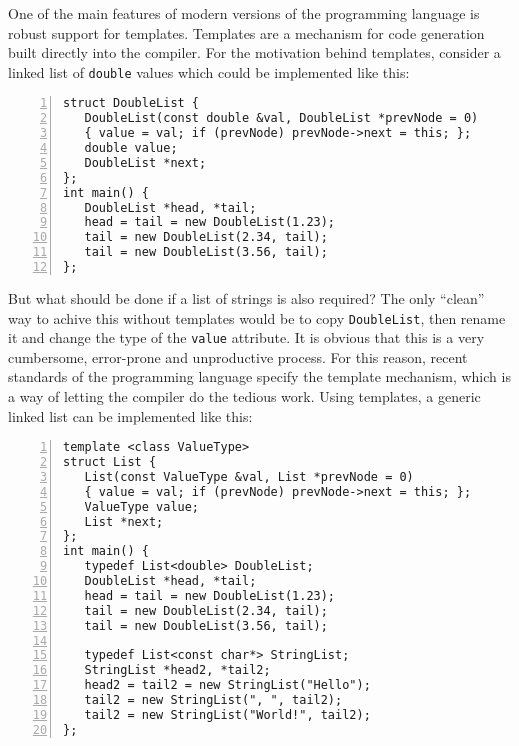 One of the main features of modern versions of the \Cplusplus programming
language is robust support for templates. Templates are a mechanism
for code generation built directly into the compiler.  For the
motivation behind templates, consider a linked list of \texttt{double}
values which could be implemented like this:
\begin{lstlisting}[basicstyle=\ttfamily\scriptsize,numbers=left,numberstyle=\tiny, numbersep=5pt]
struct DoubleList {
   DoubleList(const double &val, DoubleList *prevNode = 0)
   { value = val; if (prevNode) prevNode->next = this; };
   double value;
   DoubleList *next;
};
int main() {
   DoubleList *head, *tail;
   head = tail = new DoubleList(1.23);
   tail = new DoubleList(2.34, tail);
   tail = new DoubleList(3.56, tail);
};
\end{lstlisting}
But what should be done if a list of strings is also required? The
only ``clean'' way to achive this without templates would be to copy
\texttt{DoubleList}, then rename it and change the type of the
\texttt{value} attribute. It is obvious that this is a very
cumbersome, error-prone and unproductive process. For this reason,
recent standards of the \Cplusplus programming language specify the template
mechanism, which is a way of letting the compiler do the tedious work. Using
templates, a generic linked list can be implemented like this:
\begin{lstlisting}[basicstyle=\ttfamily\scriptsize,numbers=left,numberstyle=\tiny, numbersep=5pt]
template <class ValueType>
struct List {
   List(const ValueType &val, List *prevNode = 0)
   { value = val; if (prevNode) prevNode->next = this; };
   ValueType value;
   List *next;
};
int main() {
   typedef List<double> DoubleList;
   DoubleList *head, *tail;
   head = tail = new DoubleList(1.23);
   tail = new DoubleList(2.34, tail);
   tail = new DoubleList(3.56, tail);

   typedef List<const char*> StringList;
   StringList *head2, *tail2;
   head2 = tail2 = new StringList("Hello");
   tail2 = new StringList(", ", tail2);
   tail2 = new StringList("World!", tail2);
};
\end{lstlisting}


